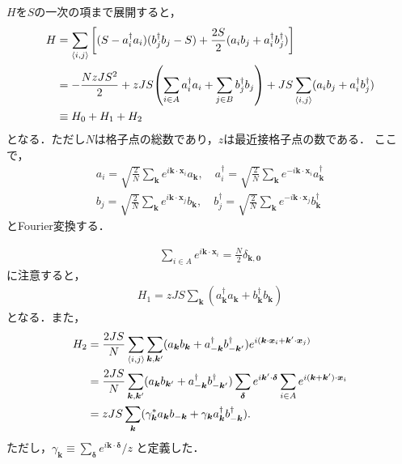 \documentclass[\main/main.tex]{subfiles}
\begin{document}
\begin{frame}
    $H$を$S$の一次の項まで展開すると，
    \begin{align}
        H
        & \nonumber
        = \sum_{\expval{i,j}}\qty[(S - a_i^\dagger a_i)(b_j^\dagger b_j - S)+\frac{2S}{2}(a_i b_j + a_i^\dagger b_j^\dagger)]
        \\ & \nonumber
        = -\frac{NzJS^2}{2} + zJS \qty(\sum_{i \in A} a_i^\dagger a_i + \sum_{j \in B} b_j^\dagger b_j)
        +JS \sum_{\expval{i,j}}(a_i b_j + a_i^\dagger b_j^\dagger)
        \\ &
        \equiv H_0 + H_1 + H_2
    \end{align}
    となる．ただし$N$は格子点の総数であり，$z$は最近接格子点の数である．
    ここで，
    \begin{align}
        a_i = \sqrt{\frac{2}{N}} \sum_{\bm{k}} e^{i\bm{k}\cdot \bm{x}_i} a_{\bm{k}},
        \quad
        a_i^\dagger = \sqrt{\frac{2}{N}} \sum_{\bm{k}} e^{-i \bm{k}\cdot \bm{x}_i} a_{\bm{k}}^\dagger
        \\
        b_j = \sqrt{\frac{2}{N}} \sum_{\bm{k}} e^{i \bm{k}\cdot \bm{x}_j} b_{\bm{k}},
        \quad
        b_j^\dagger = \sqrt{\frac{2}{N}} \sum_{\bm{k}} e^{-i \bm{k}\cdot \bm{x}_j} b_{\bm{k}}^\dagger
    \end{align}
    とFourier変換する．
\end{frame}

\begin{frame}{}
    \begin{align}
        \sum_{i \in A} e^{i \bm{k} \cdot \bm{x}_i} = \frac{N}{2}\delta_{\bm{k},\bm{0}}
    \end{align}
    に注意すると，
    \begin{align}
        H_1 = zJS \sum_{\bm{k}}(a_{\bm{k}}^\dagger a_{\bm{k}} + b_{\bm{k}}^\dagger b_{\bm{k}})
    \end{align}
    となる．また，
    \begin{align}
        H_2
        &\nonumber
        = \frac{2JS}{N} \sum_{\expval{i,j}} \sum_{\bm{k}, \bm{k}'} (a_{\bm{k}} b_{\bm{k}} + a_{-\bm{k}}^\dagger b_{-\bm{k}'}^\dagger)e^{i (\bm{k}\cdot \bm{x}_i + \bm{k}' \cdot \bm{x}_j)}
        \\ &\nonumber
        = \frac{2JS}{N} \sum_{\bm{k}, \bm{k}'} (a_{\bm{k}} b_{\bm{k}'} + a_{-\bm{k}}^\dagger b_{-\bm{k}'}^\dagger) 
        \sum_{\bm{\delta}} e^{i \bm{k}'\cdot \bm{\delta}}
        \sum_{i \in A}  e^{i(\bm{k}+\bm{k}')\cdot \bm{x}_i}
        \\ &
        = zJS \sum_{\bm{k}} (\gamma_{\bm{k}}^* a_{\bm{k}} b_{-\bm{k}} + \gamma_{\bm{k}} a_{\bm{k}}^\dagger b_{-\bm{k}}^\dagger).
    \end{align}
    ただし，$\gamma_{\bm{k}} \equiv \sum_{\bm{\delta}} e^{i \bm{k}\cdot \bm{\delta}}/z$
    と定義した．
\end{frame}
\end{document}
